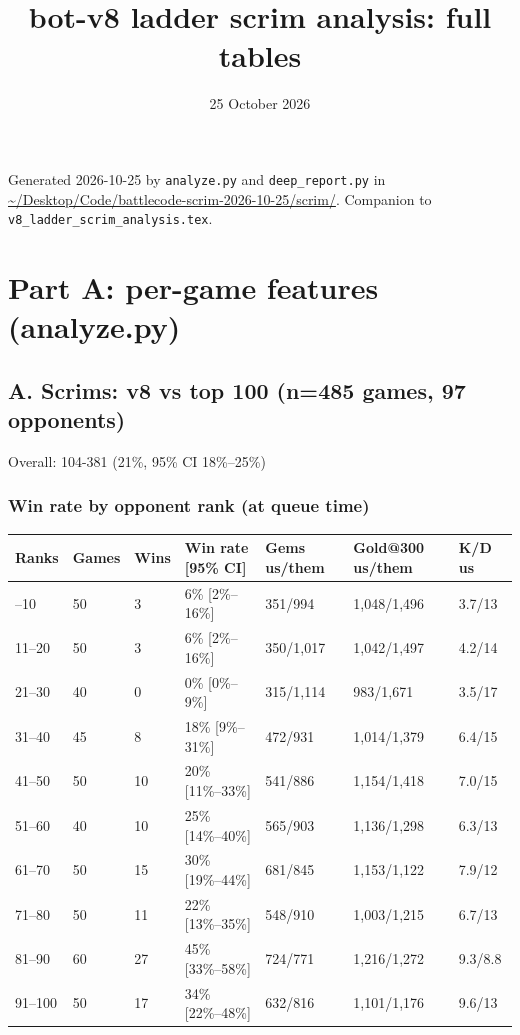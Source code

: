 \documentclass[
  10pt,
]{article}
\title{bot-v8 ladder scrim analysis: full tables}
\author{}
\date{25 October 2026}
\newcounter{none} %
\begin{document}
\maketitle

{
\setcounter{tocdepth}{2}
\tableofcontents
}
Generated 2026-10-25 by \texttt{analyze.py} and \texttt{deep\_report.py}
in
\url{~/Desktop/Code/battlecode-scrim-2026-10-25/scrim/}.
Companion to \texttt{v8\_ladder\_scrim\_analysis.tex}.

\section{Part A: per-game features
(analyze.py)}\label{part-a-per-game-features-analyzepy}

\subsection{A. Scrims: v8 vs top 100 (n=485 games, 97
opponents)}\label{a-scrims-v8-vs-top-100-n485-games-97-opponents}

Overall: 104-381 (21\%, 95\% CI 18\%--25\%)

\subsubsection{Win rate by opponent rank (at queue
time)}\label{win-rate-by-opponent-rank-at-queue-time}

{\def\LTcaptype{none} %
\begin{longtable}[]{@{}lllllll@{}}
\toprule\noalign{}
Ranks & Games & Wins & Win rate {[}95\% CI{]} & Gems us/them & Gold@300
us/them & K/D us \\
\midrule\noalign{}
\endhead
\bottomrule\noalign{}
\endlastfoot
1--10 & 50 & 3 & 6\% {[}2\%--16\%{]} & 351/994 & 1,048/1,496 & 3.7/13 \\
11--20 & 50 & 3 & 6\% {[}2\%--16\%{]} & 350/1,017 & 1,042/1,497 &
4.2/14 \\
21--30 & 40 & 0 & 0\% {[}0\%--9\%{]} & 315/1,114 & 983/1,671 & 3.5/17 \\
31--40 & 45 & 8 & 18\% {[}9\%--31\%{]} & 472/931 & 1,014/1,379 &
6.4/15 \\
41--50 & 50 & 10 & 20\% {[}11\%--33\%{]} & 541/886 & 1,154/1,418 &
7.0/15 \\
51--60 & 40 & 10 & 25\% {[}14\%--40\%{]} & 565/903 & 1,136/1,298 &
6.3/13 \\
61--70 & 50 & 15 & 30\% {[}19\%--44\%{]} & 681/845 & 1,153/1,122 &
7.9/12 \\
71--80 & 50 & 11 & 22\% {[}13\%--35\%{]} & 548/910 & 1,003/1,215 &
6.7/13 \\
81--90 & 60 & 27 & 45\% {[}33\%--58\%{]} & 724/771 & 1,216/1,272 &
9.3/8.8 \\
91--100 & 50 & 17 & 34\% {[}22\%--48\%{]} & 632/816 & 1,101/1,176 &
9.6/13 \\
\end{longtable}
}
\end{document}
